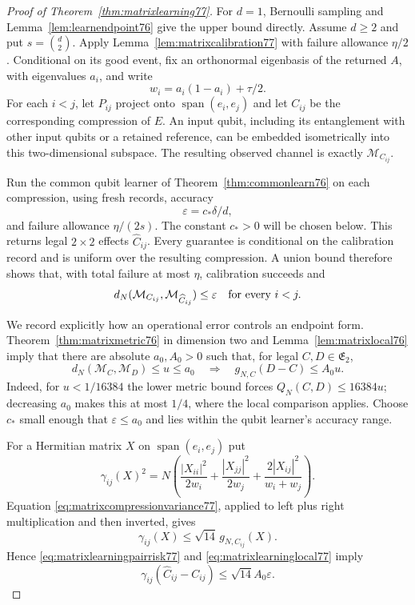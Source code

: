\begin{proof}[Proof of Theorem~\ref{thm:matrixlearning77}]
For $d=1$, Bernoulli sampling and
Lemma~\ref{lem:learnendpoint76} give the upper bound directly.
Assume $d\ge2$ and put $s=\binom d2$.  Apply
Lemma~\ref{lem:matrixcalibration77} with failure allowance $\eta/2$.
Conditional on its good event, fix an orthonormal eigenbasis of
the returned $A$, with eigenvalues $a_i$, and write
\[
 w_i=a_i(1-a_i)+\tau/2.
\]
For each $i<j$, let $P_{ij}$ project onto
$\operatorname{span}(e_i,e_j)$ and let $C_{ij}$ be the corresponding
compression of $E$.  An input qubit, including its entanglement
with other input qubits or a retained reference, can be embedded
isometrically into this two-dimensional subspace.  The resulting
observed channel is exactly $\mathcal M_{C_{ij}}$.

Run the common qubit learner of
Theorem~\ref{thm:commonlearn76} on each compression, using fresh
records, accuracy
\begin{equation}\label{eq:matrixlearningpairaccuracy77}
 \varepsilon=c_*\delta/d,
\end{equation}
and failure allowance $\eta/(2s)$.  The constant $c_*>0$ will be
chosen below.  This returns legal $2\times2$ effects $\widehat C_{ij}$.
Every guarantee is conditional on the calibration record and is
uniform over the resulting compression.  A union bound therefore
shows that, with total failure at most $\eta$, calibration succeeds
and
\begin{equation}\label{eq:matrixlearningpairrisk77}
 d_N(\mathcal M_{C_{ij}},\mathcal M_{\widehat C_{ij}})
 \le\varepsilon\quad\hbox{for every }i<j.
\end{equation}

We record explicitly how an operational error controls an endpoint
form.  Theorem~\ref{thm:matrixmetric76} in dimension two and
Lemma~\ref{lem:matrixlocal76} imply that there are absolute
$a_0,A_0>0$ such that, for legal $C,D\in\mathfrak E_2$,
\begin{equation}\label{eq:matrixlearninglocal77}
 d_N(\mathcal M_C,\mathcal M_D)\le u\le a_0
 \quad\Longrightarrow\quad g_{N,C}(D-C)\le A_0u.
\end{equation}
Indeed, for $u<1/16384$ the lower metric bound forces
$Q_N(C,D)\le16384u$; decreasing $a_0$ makes this at most $1/4$,
where the local comparison applies.  Choose $c_*$ small enough that
$\varepsilon\le a_0$ and lies within the qubit learner's accuracy
range.

For a Hermitian matrix $X$ on $\operatorname{span}(e_i,e_j)$ put
\[
 \gamma_{ij}(X)^2
 =N\left(\frac{|X_{ii}|^2}{2w_i}
          +\frac{|X_{jj}|^2}{2w_j}
          +\frac{2|X_{ij}|^2}{w_i+w_j}\right).
\]
Equation \eqref{eq:matrixcompressionvariance77}, applied to left
plus right multiplication and then inverted, gives
\[
 \gamma_{ij}(X)\le\sqrt{14}\,g_{N,C_{ij}}(X).
\]
Hence \eqref{eq:matrixlearningpairrisk77} and
\eqref{eq:matrixlearninglocal77} imply
\begin{equation}\label{eq:matrixlearningpairform77}
 \gamma_{ij}(\widehat C_{ij}-C_{ij})
 \le\sqrt{14}A_0\varepsilon.
\end{equation}


\end{proof}
